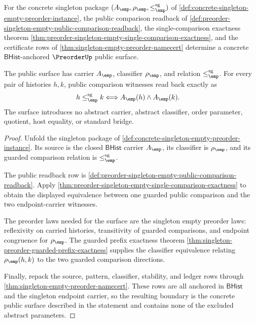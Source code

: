 \begin{theorem}
\label{thm:preorder-singleton-empty-public-certificate-boundary}
For the concrete singleton package
$(A_{\emp},\rho_{\emp},\le_{\emp}^{\mathrm{sg}})$ of
\autoref{def:concrete-singleton-empty-preorder-instance}, the public
comparison readback of
\autoref{def:preorder-singleton-empty-public-comparison-readback}, the
single-comparison exactness theorem
\autoref{thm:preorder-singleton-empty-single-comparison-exactness}, and the
certificate rows of \autoref{thm:singleton-empty-preorder-namecert} determine
a concrete $\mathsf{BHist}$-anchored $\PreorderUp$ public surface.

The public surface has carrier $A_{\emp}$, classifier $\rho_{\emp}$, and
relation $\le_{\emp}^{\mathrm{sg}}$. For every pair of histories $h,k$,
public comparison witnesses read back exactly as
$$
h\le_{\emp}^{\mathrm{sg}}k
\Longleftrightarrow
A_{\emp}(h)\land A_{\emp}(k).
$$
The surface introduces no abstract carrier, abstract classifier, order
parameter, quotient, host equality, or standard bridge.
\end{theorem}
\begin{proof}
Unfold the singleton package of
\autoref{def:concrete-singleton-empty-preorder-instance}. Its source is the
closed $\mathsf{BHist}$ carrier $A_{\emp}$, its classifier is
$\rho_{\emp}$, and its guarded comparison relation is
$\le_{\emp}^{\mathrm{sg}}$.

The public readback row is
\autoref{def:preorder-singleton-empty-public-comparison-readback}. Apply
\autoref{thm:preorder-singleton-empty-single-comparison-exactness} to obtain
the displayed equivalence between one guarded public comparison and the two
endpoint-carrier witnesses.

The preorder laws needed for the surface are the singleton empty preorder
laws: reflexivity on carried histories, transitivity of guarded comparisons,
and endpoint congruence for $\rho_{\emp}$. The guarded prefix exactness theorem
\autoref{thm:singleton-preorder-guarded-prefix-exactness} supplies the
classifier equivalence relating $\rho_{\emp}(h,k)$ to the two guarded
comparison directions.

Finally, repack the source, pattern, classifier, stability, and ledger rows
through \autoref{thm:singleton-empty-preorder-namecert}. These rows are all
anchored in $\mathsf{BHist}$ and the singleton endpoint carrier, so the
resulting boundary is the concrete public surface described in the statement
and contains none of the excluded abstract parameters.
\end{proof}



